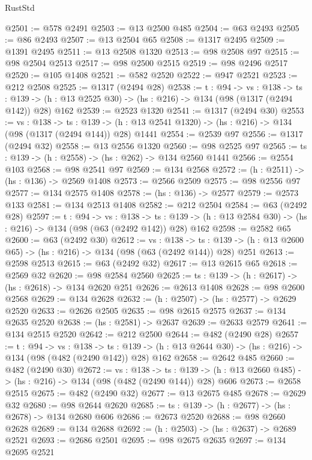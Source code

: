 \begin{lexlean}{RustStd}
\begin{coremodule}
@2501 := @578 @2491
@2503 := @13 @2500 @485
@2504 := @63 @2493
@2505 := @86 @2493
@2507 := @13 @2504 @65
@2508 := @1317 @2495
@2509 := @1391 @2495
@2511 := @13 @2508 @1320
@2513 := @98 @2508 @97
@2515 := @98 @2504 @2513
@2517 := @98 @2500 @2515
@2519 := @98 @2496 @2517
@2520 := @105 @1408
@2521 := @582 @2520
@2522 := @947 @2521
@2523 := @212 @2508
@2525 := @1317 (@2494 @28)
@2538 := {t : @94} ->
  {vs : @138} ->
  {ts : @139} -> (h : @13 @2525 @30) -> (hs : @216) -> @134 (@98 (@1317 (@2494 @142)) @28) @162
@2539 := @2523 @1320
@2541 := @1317 (@2494 @30)
@2553 := {vs : @138} ->
  {ts : @139} -> (h : @13 @2541 @1320) -> (hs : @216) -> @134 (@98 (@1317 (@2494 @144)) @28) @1441
@2554 := @2539 @97
@2556 := @1317 (@2494 @32)
@2558 := @13 @2556 @1320
@2560 := @98 @2525 @97
@2565 := {ts : @139} -> (h : @2558) -> (hs : @262) -> @134 @2560 @1441
@2566 := @2554 @103
@2568 := @98 @2541 @97
@2569 := @134 @2568
@2572 := (h : @2511) -> (hs : @136) -> @2569 @1408
@2573 := @2566 @2509
@2575 := @98 @2556 @97
@2577 := @134 @2575 @1408
@2578 := (hs : @136) -> @2577
@2579 := @2573 @133
@2581 := @134 @2513 @1408
@2582 := @212 @2504
@2584 := @63 (@2492 @28)
@2597 := {t : @94} ->
  {vs : @138} ->
  {ts : @139} -> (h : @13 @2584 @30) -> (hs : @216) -> @134 (@98 (@63 (@2492 @142)) @28) @162
@2598 := @2582 @65
@2600 := @63 (@2492 @30)
@2612 := {vs : @138} ->
  {ts : @139} -> (h : @13 @2600 @65) -> (hs : @216) -> @134 (@98 (@63 (@2492 @144)) @28) @251
@2613 := @2598 @2513
@2615 := @63 (@2492 @32)
@2617 := @13 @2615 @65
@2618 := @2569 @32
@2620 := @98 @2584 @2560
@2625 := {ts : @139} -> (h : @2617) -> (hs : @2618) -> @134 @2620 @251
@2626 := @2613 @1408
@2628 := @98 @2600 @2568
@2629 := @134 @2628
@2632 := (h : @2507) -> (hs : @2577) -> @2629 @2520
@2633 := @2626 @2505
@2635 := @98 @2615 @2575
@2637 := @134 @2635 @2520
@2638 := (hs : @2581) -> @2637
@2639 := @2633 @2579
@2641 := @134 @2515 @2520
@2642 := @212 @2500
@2644 := @482 (@2490 @28)
@2657 := {t : @94} ->
  {vs : @138} ->
  {ts : @139} -> (h : @13 @2644 @30) -> (hs : @216) -> @134 (@98 (@482 (@2490 @142)) @28) @162
@2658 := @2642 @485
@2660 := @482 (@2490 @30)
@2672 := {vs : @138} ->
  {ts : @139} -> (h : @13 @2660 @485) -> (hs : @216) -> @134 (@98 (@482 (@2490 @144)) @28) @606
@2673 := @2658 @2515
@2675 := @482 (@2490 @32)
@2677 := @13 @2675 @485
@2678 := @2629 @32
@2680 := @98 @2644 @2620
@2685 := {ts : @139} -> (h : @2677) -> (hs : @2678) -> @134 @2680 @606
@2686 := @2673 @2520
@2688 := @98 @2660 @2628
@2689 := @134 @2688
@2692 := (h : @2503) -> (hs : @2637) -> @2689 @2521
@2693 := @2686 @2501
@2695 := @98 @2675 @2635
@2697 := @134 @2695 @2521

\end{coremodule}
\end{lexlean}
